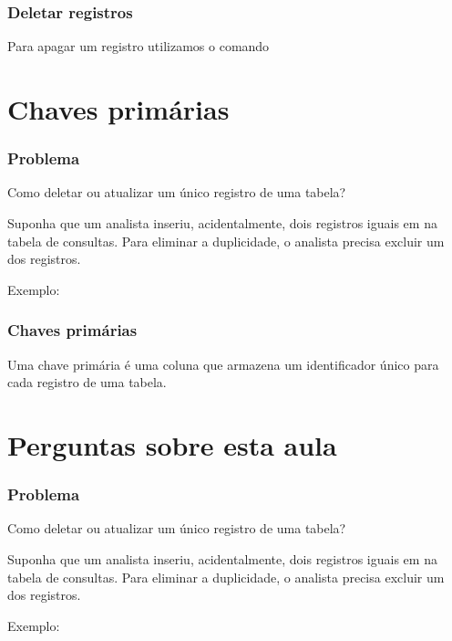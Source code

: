 \documentclass[t, 10pt, aspectratio=169, table, x11names]{beamer}
\begin{document}
	\begin{frame}
		\frametitle{Deletar registros}
		Para apagar um registro utilizamos o comando 
		
	\end{frame}
	
	\section{Chaves primárias}

	\begin{frame}[t]
		\frametitle{Problema}
		Como deletar ou atualizar um único registro de uma tabela?

		Suponha que um analista inseriu, acidentalmente, dois registros iguais em na tabela de consultas. Para eliminar a duplicidade, o analista precisa excluir um dos registros.

		Exemplo:
	\end{frame}

	\begin{frame}[t]
		\frametitle{Chaves primárias}
		Uma chave primária é uma coluna que armazena um identificador único para cada registro de uma tabela.
	\end{frame}

	\section{Perguntas sobre esta aula}

	\begin{frame}[t]
		\frametitle{Problema}
		Como deletar ou atualizar um único registro de uma tabela?

		Suponha que um analista inseriu, acidentalmente, dois registros iguais em na tabela de consultas. Para eliminar a duplicidade, o analista precisa excluir um dos registros.

		Exemplo:


	\end{frame}
\end{document}
